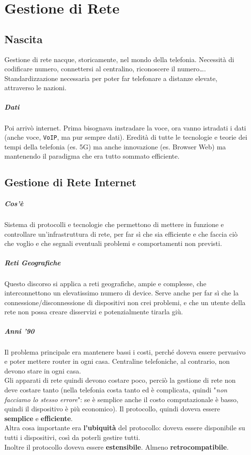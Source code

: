 \documentclass[10pt]{book}
\begin{document}
\chapter{Gestione di Rete}
\section{Nascita}
Gestione di rete nacque, storicamente, nel mondo della telefonia. Necessità di codificare numero, connettersi al centralino, riconoscere il numero\ldots. Standardizzazione necessaria per poter far telefonare a distanze elevate, attraverso le nazioni.
\paragraph{Dati} Poi arrivò internet. Prima bisognava instradare la voce, ora vanno istradati i dati (anche voce, \texttt{VoIP}, ma pur sempre dati). Eredità di tutte le tecnologie e teorie dei tempi della telefonia (es. 5G) ma anche innovazione (es. Browser Web) ma mantenendo il paradigma che era tutto sommato efficiente.
\section{Gestione di Rete Internet}
\paragraph{Cos'è} Sistema di protocolli e tecnologie che permettono di mettere in funzione e controllare un'infrastruttura di rete, per far sì che sia efficiente e che faccia ciò che voglio e che segnali eventuali problemi e comportamenti non previsti.
\paragraph{Reti Geografiche} Questo discorso si applica a reti geografiche, ampie e complesse, che interconnettono un elevatissimo numero di device. Serve anche per far sì che la connessione/disconnessione di dispositivi non crei problemi, e che un utente della rete non possa creare disservizi e potenzialmente tirarla giù.
\paragraph{Anni '90} Il problema principale era mantenere bassi i costi, perché doveva essere pervasivo e poter mettere router in ogni casa. Centraline telefoniche, al contrario, non devono stare in ogni casa.\\
Gli apparati di rete quindi devono costare poco, perciò la gestione di rete non deve costare tanto (nella telefonia costa tanto ed è complicata, quindi "\textit{non facciamo lo stesso errore}": se è semplice anche il costo computazionale è basso, quindi il dispositivo è più economico). Il protocollo, quindi doveva essere \textbf{semplice} e \textbf{efficiente}.\\
Altra cosa importante era \textbf{l'ubiquità} del protocollo: doveva essere disponibile su tutti i dispositivi, così da poterli gestire tutti.\\
Inoltre il protocollo doveva essere \textbf{estensibile}. Almeno \textbf{retrocompatibile}.
\end{document}
